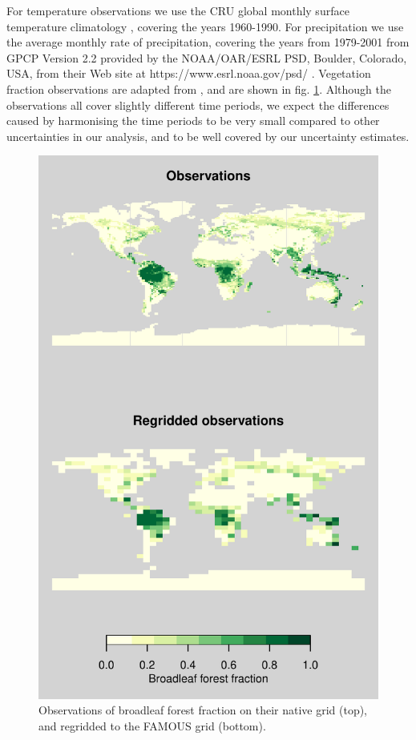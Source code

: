 \documentclass[gmd, manuscript]{copernicus}
\begin{document}
For temperature observations we use the CRU global monthly surface temperature climatology \cite{jones1999face}, covering the years 1960-1990. For precipitation we use the average monthly rate of precipitation, covering the years from 1979-2001 from GPCP Version 2.2 provided by the NOAA/OAR/ESRL PSD, Boulder, Colorado, USA, from their Web site at https://www.esrl.noaa.gov/psd/ \cite{Adler2003}. Vegetation fraction observations are adapted from \cite{loveland2000landcover}, and are shown in fig. \ref{fig:map_comparison}. Although the observations all cover slightly different time periods, we expect the differences caused by harmonising the time periods to be very small compared to other uncertainties in our analysis, and to be well covered by our uncertainty estimates.

\begin{figure}[t]
\includegraphics[width=12cm]{../graphics/map_comparison.pdf}
\caption{Observations of broadleaf forest fraction on their native grid (top), and regridded to the FAMOUS grid (bottom).}
\label{fig:map_comparison}
\end{figure}
\end{document}
